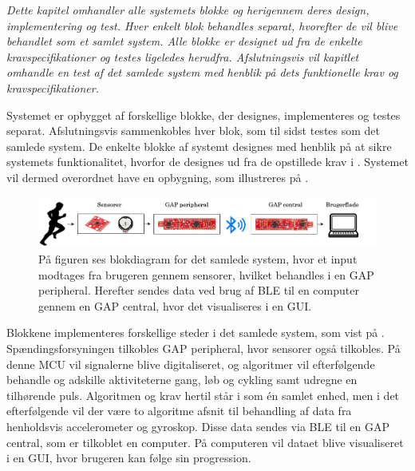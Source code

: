 \textit{Dette kapitel omhandler alle systemets blokke og herigennem deres design, implementering og test. Hver enkelt blok behandles separat, hvorefter de vil blive behandlet som et samlet system. Alle blokke er designet ud fra de enkelte kravspecifikationer og testes ligeledes herudfra. Afslutningsvis vil kapitlet omhandle en test af det samlede system med henblik på dets funktionelle krav og kravspecifikationer.}

Systemet er opbygget af forskellige blokke, der designes, implementeres og testes separat. Afslutningsvis sammenkobles hver blok, som til sidst testes som det samlede system. De enkelte blokke af systemt designes med henblik på at sikre systemets funktionalitet, hvorfor de designes ud fra de opstillede krav i . Systemet vil dermed overordnet have en opbygning, som illustreres på .
\begin{figure}[H]
	\centering
	\includegraphics[scale=0.45]{figures/bProblemloesning/blokdiagram.png}
	\caption{På figuren ses blokdiagram for det samlede system, hvor et input modtages fra brugeren gennem sensorer, hvilket behandles i en GAP peripheral. Herefter sendes data ved brug af BLE til en computer gennem en GAP central, hvor det visualiseres i en GUI.}
	\label{fig:design_blokdiagram}
\end{figure}\vspace{-0.25cm}
Blokkene implementeres forskellige steder i det samlede system, som vist på . Spændingsforsyningen tilkobles GAP peripheral, hvor sensorer også tilkobles. På denne MCU vil signalerne blive digitaliseret, og algoritmer vil efterfølgende behandle og adskille aktiviteterne gang, løb og cykling samt udregne en tilhørende puls. Algoritmen og krav hertil står i  som én samlet enhed, men i det efterfølgende vil der være to algoritme afsnit til behandling af data fra henholdsvis accelerometer og gyroskop. Disse data sendes via BLE til en GAP central, som er tilkoblet en computer. På computeren vil dataet blive visualiseret i en GUI, hvor brugeren kan følge sin progression.